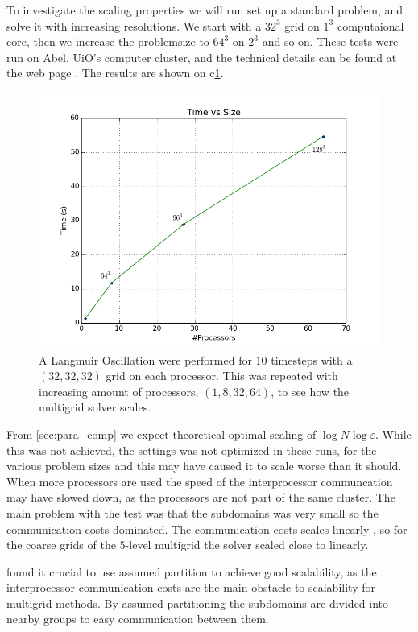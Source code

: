 	To investigate the scaling properties we will run set up a standard problem,
	and solve it with increasing resolutions. We start with a \(32^3\) grid on
 	\(1^3\) computaional core, then we increase the problemsize to \(64^3\) on \(2^3\)
	and so on. These tests were run on Abel, UiO's computer cluster, and the technical details
	can be found at the web page \citep{_more_????}. The results are shown on c\ref{fig:scalingMG}.
	\begin{figure}
		\label{fig:scalingMG}
		\includegraphics[width = \textwidth]{figures/performance/scalingMG}
		\caption{A Langmuir Oscillation were performed for \(10\) timesteps with a \((32,32,32)\) grid on each processor.
		This was repeated with increasing amount of processors, \((1, 8, 32, 64)\), to see how the multigrid solver scales.}
	\end{figure}
	From \cref{sec:para_comp} we expect theoretical optimal scaling of \(\log{N}\log{\varepsilon}\).
	While this was not achieved, the settings was not optimized in these runs, for the various problem sizes and
	this may have caused it to scale worse than it should. When more processors are used the speed of
	the interprocessor communcation may have slowed down, as the processors are not part of the
	same cluster. The main problem with the test was that the subdomains was very small so
	the communication costs dominated. The communication costs scales linearly \citep{jung_parallelization_1997}, so
	for the coarse grids of the \(5\)-level multigrid the solver scaled close to linearly.

	\citet{baker_scaling_2012} found it crucial to use assumed partition
	to achieve good scalability, as the interprocessor communication costs are the main obstacle to
	scalability for multigrid methods. By assumed partitioning the subdomains are divided into nearby groups
	to easy communication between them.
